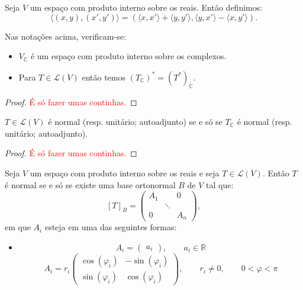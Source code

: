 \documentclass[11pt,twoside,a4paper]{book}
\begin{document}
\begin{definicao}
Seja $V$ um espaço com produto interno sobre os reais. Então definimos:
\[
\langle(x,y),(x',y')\rangle=\left(\langle x,x'\rangle+\langle y,y'\rangle,\langle y,x'\rangle-\langle x,y'\rangle\right).
\]
\end{definicao}

\begin{proposicao}
Nas notações acima, verificam-se:
\begin{itemize}
\item $V_\mathbb{C}$ é um espaço com produto interno sobre os complexos.
\item Para $T\in\mathcal{L}(V)$ então temos $(T_\mathbb{C})^*=(T^*)_\mathbb{C}.$
\end{itemize}
\end{proposicao}
\begin{proof}
\textcolor{red}{É só fazer umas continhas.}
\end{proof}

\begin{corolario}
$T\in\mathcal{L}(V)$ é normal (resp. unitário; autoadjunto) se e só se $T_\mathbb{C}$ é normal (resp. unitário; autoadjunto).
\end{corolario}
\begin{proof}
\textcolor{red}{É só fazer umas continhas.}
\end{proof}

\begin{teorema}
Seja $V$ um espaço com produto interno sobre os reais e seja $T\in\mathcal{L}(V)$. Então $T$ é normal se e só se existe uma base ortonormal $B$ de $V$ tal que:
\[
[T]_B=\begin{pmatrix}
A_1&&0\\&\ddots&\\0&&A_n
\end{pmatrix},
\]
em que $A_i$ esteja em uma das seguintes formas:
\begin{itemize}
\item
\[
A_i=\begin{pmatrix}
a_i
\end{pmatrix},\quad\quad a_i\in\mathbb{R}
\]
\[
A_i=r_i\begin{pmatrix}
\cos(\varphi_i)&-\sin(\varphi_i)\\\sin(\varphi_i)&\cos(\varphi_i)
\end{pmatrix},\quad\quad r_i\neq 0,\quad\quad0<\varphi<\pi
\]
\end{itemize}
\end{teorema}
\end{document}
